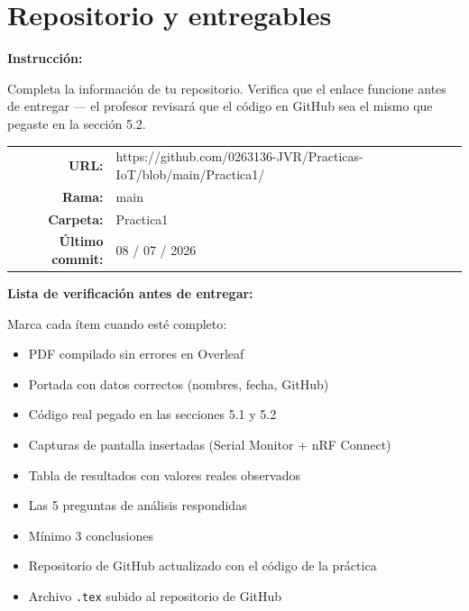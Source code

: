 \documentclass[12pt, letterpaper]{article}
\newenvironment{instruccion}{%
  \begin{mdframed}[
    backgroundcolor = tealLight,
    linecolor       = tealMain,
    linewidth       = 1pt,
    innerleftmargin = 10pt, innerrightmargin = 10pt,
    innertopmargin  = 6pt,  innerbottommargin= 6pt
  ]
  \small\color{tealMain}\textbf{Instrucción:}\hspace{4pt}\color{black}
}{%
  \end{mdframed}
}
\newenvironment{notaBox}[1][Nota]{%
  \begin{mdframed}[
    backgroundcolor = amberLight,
    linecolor       = amberMain,
    linewidth       = 1pt,
    innerleftmargin = 10pt, innerrightmargin = 10pt,
    innertopmargin  = 6pt,  innerbottommargin= 6pt
  ]
  \small\textbf{\color{amberMain}#1:}\hspace{4pt}
}{%
  \end{mdframed}
}
\begin{document}
\section{Repositorio y entregables}

\begin{instruccion}
  Completa la información de tu repositorio. Verifica que el enlace funcione
  antes de entregar — el profesor revisará que el código en GitHub sea el mismo
  que pegaste en la sección 5.2.
\end{instruccion}

\vspace{0.5cm}

\begin{tabular}{rl}
  \textbf{URL:}&
    https://github.com/0263136-JVR/Practicas-IoT/blob/main/Practica1/\\[0.6em]%
  \textbf{Rama:} &
    main\\[0.6em]%
  \textbf{Carpeta:}&
    Practica1\\[0.6em]%
  \textbf{Último commit:}&
    08 / 07 / 2026\\[0.6em] %
\end{tabular}

\vspace{0.8cm}

\begin{notaBox}[Lista de verificación antes de entregar]
  Marca cada ítem cuando esté completo:
  \begin{itemize}[leftmargin=1.5cm, label=$\square$]
    \item PDF compilado sin errores en Overleaf
    \item Portada con datos correctos (nombres, fecha, GitHub)
    \item Código real pegado en las secciones 5.1 y 5.2
    \item Capturas de pantalla insertadas (Serial Monitor + nRF Connect)
    \item Tabla de resultados con valores reales observados
    \item Las 5 preguntas de análisis respondidas
    \item Mínimo 3 conclusiones
    \item Repositorio de GitHub actualizado con el código de la práctica
    \item Archivo \texttt{.tex} subido al repositorio de GitHub
  \end{itemize}
\end{notaBox}
\end{document}
